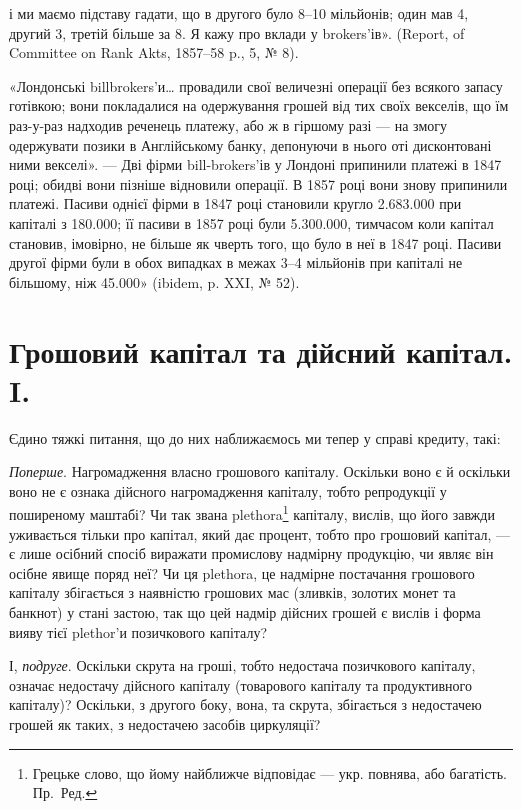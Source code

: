 \parcont{}  %
і ми маємо підставу гадати, що в другого було 8--10 мільйонів; один мав 4,
другий 3, третій більше за 8. Я кажу про вклади у brokers’ів». (Report,
of Committee on Rank Akts, 1857--58 p., 5, № 8).

«Лондонські billbrokers’и\dots{} провадили свої величезні операції без всякого
запасу готівкою; вони покладалися на одержування грошей від тих своїх векселів,
що їм раз-у-раз надходив реченець платежу, або ж в гіршому разі — на змогу
одержувати позики в Англійському банку, депонуючи в нього оті дисконтовані
ними векселі». — Дві фірми bill-brokers’ів у Лондоні припинили платежі в
1847 році; обидві вони пізніше відновили операції. В 1857 році вони знову
припинили платежі. Пасиви однієї фірми в 1847 році становили кругло
\num{2.683.000} при капіталі з \num{180.000}; її пасиви в 1857 році були \deq{}
\num{5.300.000}, тимчасом коли капітал становив, імовірно, не більше як чверть
того, що було в неї в 1847 році. Пасиви другої фірми були в обох випадках
в межах 3--4 мільйонів при капіталі не більшому, ніж \num{45.000}» (ibidem,
p. XXI, № 52).

\section{Грошовий капітал та дійсний капітал. I.}

Єдино тяжкі питання, що до них наближаємось ми тепер у справі кредиту,
такі:

\emph{Поперше}. Нагромадження власно грошового капіталу. Оскільки воно
є й оскільки воно не є ознака дійсного нагромадження капіталу, тобто репродукції
у поширеному маштабі? Чи так звана plethora\footnote*{
Грецьке слово, що йому найближче відповідає — укр. повнява, або багатість. Пр.~Ред.
} капіталу, вислів, що його
завжди уживається тільки про капітал, який дає процент, тобто про грошовий
капітал, — є лише осібний спосіб виражати промислову надмірну продукцію,
чи являє він осібне явище поряд неї? Чи ця plethora, це надмірне постачання
грошового капіталу збігається з наявністю грошових мас (зливків,
золотих монет та банкнот) у стані застою, так що цей надмір дійсних грошей
є вислів і форма вияву тієї plethor’и позичкового капіталу?

І, \emph{подруге}. Оскільки скрута на гроші, тобто недостача позичкового капіталу,
означає недостачу дійсного капіталу (товарового капіталу та продуктивного
капіталу)? Оскільки, з другого боку, вона, та скрута, збігається з недостачею
грошей як таких, з недостачею засобів циркуляції?

